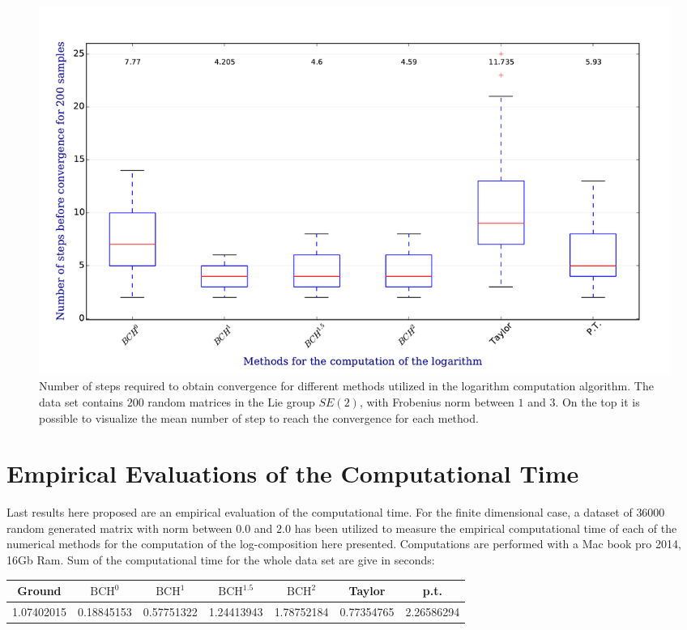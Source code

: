 \begin{figure}[!ht]
	\hspace{-0.5cm}
	\includegraphics[scale=0.5]{figures/log_computation_boxplot.pdf}
	\caption{Number of steps required to obtain convergence for different methods utilized in the logarithm computation algorithm. The data set contains $200$ random matrices in the Lie group $SE(2)$, with Frobenius norm between $1$ and $3$. On the top it is possible to visualize the mean number of step to reach the convergence for each method.}
	\label{fig:log_computation_boxplot}
\end{figure}


\section{Empirical Evaluations of the Computational Time}

Last results here proposed are an empirical evaluation of the computational time. 
For the finite dimensional case, a dataset of $36000$ random generated matrix with norm between $0.0$ and $2.0$ has been utilized to measure the empirical computational time of each of the numerical methods for the computation of the log-composition here presented. Computations are performed with a Mac book pro 2014, 16Gb Ram. Sum of the computational time for the whole data set are give in seconds:\\

\hspace{-1cm}
\begin{tabular}{ c | c | c | c | c | c | c }
Ground & $\text{BCH}^0$ & $\text{BCH}^1$ & $\text{BCH}^{1.5}$ & $\text{BCH}^2$ & Taylor & p.t. \\
\hline
1.07402015 & 0.18845153 & 0.57751322 & 1.24413943 & 1.78752184 & 0.77354765 &
2.26586294 
\end{tabular}
\vspace{0.5cm}

